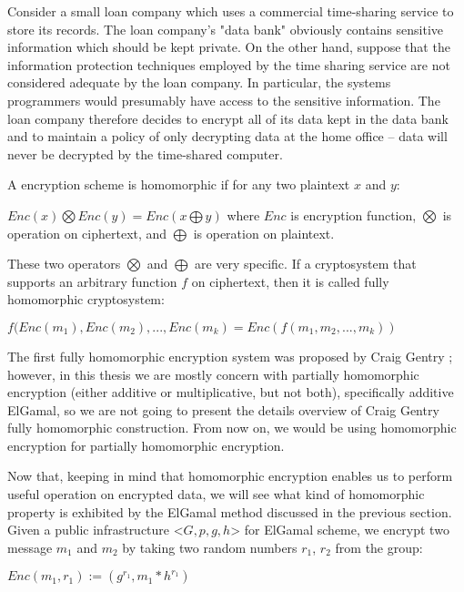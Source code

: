 \begin{enumerate}
\begin{displayquote}
	     Consider a small loan company which uses a commercial time-sharing service to store its records.  
	     The loan company’s "data bank" obviously contains sensitive information which should be kept private.  
	     On the other hand, suppose that the information protection techniques employed by the time sharing 
	     service are not considered adequate by the loan company.  In particular, the systems programmers would 
	     presumably have access to the sensitive information.  The loan company therefore decides to encrypt all 
	     of its data kept in the data bank and to maintain a policy of only decrypting data at the home office -- data 
	     will never be decrypted by the time-shared computer.
	     
	     \end{displayquote}  
	     
		A encryption scheme is homomorphic if for any two plaintext $x$ and $y$:
		\begin{displayquote}
		
		 $Enc(x) \bigotimes Enc(y) = Enc (x \bigoplus y)$  where 
		$Enc$ is encryption function, $\bigotimes$ is operation on ciphertext, and $\bigoplus$
		 is operation on plaintext.
		
		\end{displayquote}
				
		These two operators $\bigotimes$ and $\bigoplus$ are very specific. If a cryptosystem that supports an arbitrary 
		function $f$ on ciphertext, then it is called fully homomorphic cryptosystem:
		\begin{displayquote}
		  $ f (Enc(m_{1}), Enc(m_{2}), ..., Enc(m_{k}) = Enc( f (m_{1}, m_{2}, ..., m_{k}))$ 
	    \end{displayquote}
		
		\noindent
		The first fully homomorphic encryption system was proposed by Craig Gentry \citep{Gentry:2009:FHE:1834954}; however, 
		in this thesis we are mostly concern with partially homomorphic encryption (either additive or multiplicative, but not both),
		specifically additive ElGamal, 
		so we are not going to present the details overview 
		of Craig Gentry fully homomorphic construction. From now on, we would be using homomorphic encryption for 
		partially homomorphic encryption. 
		 	    
	    
	    
	    
	     
	    Now that, keeping in mind that homomorphic encryption enables us to perform useful operation on encrypted data, 
	    we will see what kind of homomorphic property is exhibited by the ElGamal method discussed in the previous section. 
	    Given a public infrastructure <$G, p, g, h$> for ElGamal scheme, 
	     we encrypt two message $m_{1}$ and $m_{2}$ by taking two random numbers $r_{1}$,  $r_{2}$ from the group:
	     \begin{displayquote}
	     $Enc(m_{1}, r_{1}) := (g^{r_{1}}, m_{1} *  h^{r_{1}})$ 
	      \end{displayquote}
	     

\end{enumerate}
